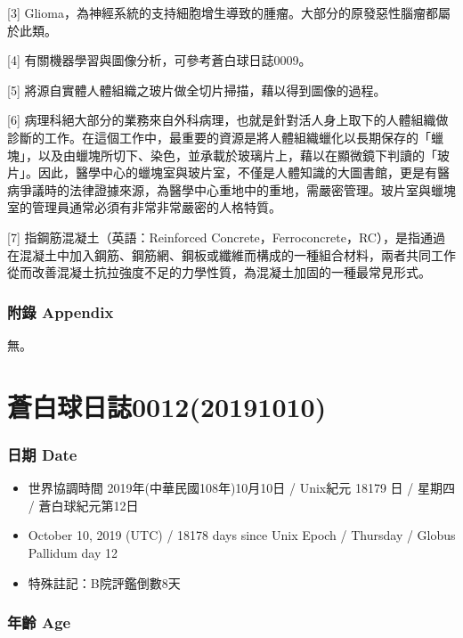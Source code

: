 \documentclass[a5paper, 12pt
]{book}
\providecommand{\tightlist}{%
  \setlength{\itemsep}{0pt}\setlength{\parskip}{0pt}}
\begin{document}
{[}3{]}
Glioma，為神經系統的支持細胞增生導致的腫瘤。大部分的原發惡性腦瘤都屬於此類。

{[}4{]} 有關機器學習與圖像分析，可參考蒼白球日誌0009。

{[}5{]} 將源自實體人體組織之玻片做全切片掃描，藉以得到圖像的過程。

{[}6{]}
病理科絕大部分的業務來自外科病理，也就是針對活人身上取下的人體組織做診斷的工作。在這個工作中，最重要的資源是將人體組織蠟化以長期保存的「蠟塊」，以及由蠟塊所切下、染色，並承載於玻璃片上，藉以在顯微鏡下判讀的「玻片」。因此，醫學中心的蠟塊室與玻片室，不僅是人體知識的大圖書館，更是有醫病爭議時的法律證據來源，為醫學中心重地中的重地，需嚴密管理。玻片室與蠟塊室的管理員通常必須有非常非常嚴密的人格特質。

{[}7{]} 指鋼筋混凝土（英語：Reinforced
Concrete，Ferroconcrete，RC），是指通過在混凝土中加入鋼筋、鋼筋網、鋼板或纖維而構成的一種組合材料，兩者共同工作從而改善混凝土抗拉強度不足的力學性質，為混凝土加固的一種最常見形式。

\hypertarget{ux9644ux9304-appendix-4}{%
\subsubsection{附錄 Appendix}\label{ux9644ux9304-appendix-4}}

無。

\hypertarget{ux84bcux767dux7403ux65e5ux8a8c001220191010}{%
\section{蒼白球日誌0012(20191010)}\label{ux84bcux767dux7403ux65e5ux8a8c001220191010}}

\hypertarget{ux65e5ux671f-date-11}{%
\subsubsection{日期 Date}\label{ux65e5ux671f-date-11}}

\begin{itemize}
\tightlist
\item
  世界協調時間 2019年(中華民國108年)10月10日 / Unix紀元 18179 日 /
  星期四 / 蒼白球紀元第12日
\item
  October 10, 2019 (UTC) / 18178 days since Unix Epoch / Thursday /
  Globus Pallidum day 12
\item
  特殊註記：B院評鑑倒數8天
\end{itemize}

\hypertarget{ux5e74ux9f61-age-11}{%
\subsubsection{年齡 Age}\label{ux5e74ux9f61-age-11}}
\end{document}

